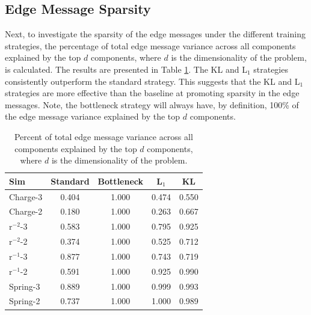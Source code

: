 \documentclass[11pt]{article}
\begin{document}
    \subsection{Edge Message Sparsity}
    Next, to investigate the sparsity of the edge messages under the different training strategies, the percentage of total edge message variance across all components explained by the top $d$ components, where $d$ is the dimensionality of the problem, is calculated. The results are presented in Table \ref{tab:scarcity}. The KL and L$_1$ strategies consistently outperform the standard strategy. This suggests that the KL and L$_1$ strategies are more effective than the baseline at promoting sparsity in the edge messages. Note, the bottleneck strategy will always have, by definition, 100\% of the edge message variance explained by the top $d$ components.
    \begin{table}[H]
        \centering
        \begin{tabular}{lcccc}
        \hline
        Sim & Standard & Bottleneck & L$_1$ & KL \\
        \hline
        Charge-3 & 0.404 & 1.000 & 0.474 & 0.550 \\
        Charge-2 & 0.180 & 1.000 & 0.263 & 0.667 \\
        r$^{-2}$-3 & 0.583 & 1.000 & 0.795 & 0.925 \\
        r$^{-2}$-2 & 0.374 & 1.000 & 0.525 & 0.712 \\
        r$^{-1}$-3 & 0.877 & 1.000 & 0.743 & 0.719 \\
        r$^{-1}$-2 & 0.591 & 1.000 & 0.925 & 0.990 \\
        Spring-3 & 0.889 & 1.000 & 0.999  & 0.993 \\
        Spring-2 & 0.737 & 1.000 & 1.000 & 0.989 \\
        \hline
        \end{tabular}
        \caption{Percent of total edge message variance across all components explained by the top $d$ components, where $d$ is the dimensionality of the problem.}
        \label{tab:scarcity}
    \end{table}
\end{document}
